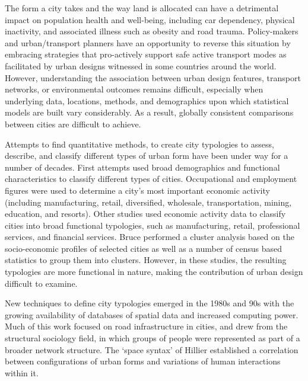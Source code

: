 \documentclass{nature}
\begin{document}


The form a city takes and the way land is allocated can have a detrimental impact on population health and well-being, including car dependency, physical inactivity, and associated illness such as obesity and road trauma\cite{Giles-corti2016,Kleinert2016,Goenka2016,Zapata-Diomedi2017,Heesch2014,Daley2011, Cepeda2016,MingWen2008,Norman2006,Thompson2018b}. Policy-makers and urban/transport planners have an opportunity to reverse this situation by embracing strategies that pro-actively support safe active transport modes as facilitated by urban designs witnessed in some countries around the world. However, understanding the association between urban design features, transport networks, or environmental outcomes remains difficult, especially when underlying data, locations, methods, and demographics upon which statistical models are built vary considerably. As a result, globally consistent comparisons between cities are difficult to achieve. 

Attempts to find quantitative methods, to create city typologies to assess, describe, and classify different types of urban form have been under way for a number of decades. First attempts used broad demographics and functional characteristics to classify different types of cities. Occupational and employment figures were used to determine a city's most important economic activity (including manufacturing, retail, diversified, wholesale, transportation, mining, education, and resorts)\cite{Harris1943}. Other studies used economic activity data to classify cities into broad functional typologies, such as manufacturing, retail, professional services, and financial services\cite{Nelson1955}. Bruce\cite{Bruce1971} performed a cluster analysis based on the socio-economic profiles of selected cities as well as a number of census based statistics to group them into clusters. However, in these studies, the resulting typologies are more functional in nature, making the contribution of urban design difficult to examine.

New techniques to define city typologies emerged in the 1980s and 90s with the growing availability of databases of spatial data and increased computing power. Much of this work focused on road infrastructure in cities, and drew from the structural sociology field, in which groups of people were represented as part of a broader network structure. The `space syntax' of Hillier\cite{Hillier1996} established a correlation between configurations of urban forms and variations of human interactions within it. 
\end{document}
